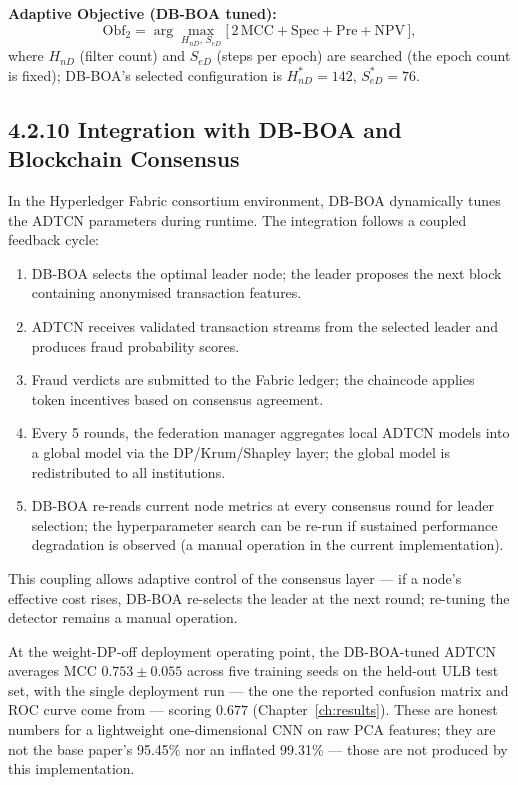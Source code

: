 \textbf{Adaptive Objective (DB-BOA tuned):}
\begin{equation}\label{eq:obf2_adtcn}
    \mathrm{Obf}_2 = \arg\max_{H_{nD},\, S_{eD}}
    \big[\, 2\,\mathrm{MCC} + \mathrm{Spec} + \mathrm{Pre} + \mathrm{NPV} \,\big],
\end{equation}
where $H_{nD}$ (filter count) and $S_{eD}$ (steps per epoch) are searched (the epoch count is fixed); DB-BOA's selected configuration is $H_{nD}^\ast = 142$, $S_{eD}^\ast = 76$.

\subsection*{4.2.10 Integration with DB-BOA and Blockchain Consensus}

In the Hyperledger Fabric consortium environment, DB-BOA dynamically tunes the ADTCN parameters during runtime. The integration follows a coupled feedback cycle:
\begin{enumerate}
    \item DB-BOA selects the optimal leader node; the leader proposes the next block containing anonymised transaction features.
    \item ADTCN receives validated transaction streams from the selected leader and produces fraud probability scores.
    \item Fraud verdicts are submitted to the Fabric ledger; the chaincode applies token incentives based on consensus agreement.
    \item Every 5 rounds, the federation manager aggregates local ADTCN models into a global model via the DP/Krum/Shapley layer; the global model is redistributed to all institutions.
    \item DB-BOA re-reads current node metrics at every consensus round for leader selection; the hyperparameter search can be re-run if sustained performance degradation is observed (a manual operation in the current implementation).
\end{enumerate}

This coupling allows adaptive control of the consensus layer — if a node's effective cost rises, DB-BOA re-selects the leader at the next round; re-tuning the detector remains a manual operation.

At the weight-DP-off deployment operating point, the DB-BOA-tuned ADTCN averages MCC $0.753 \pm 0.055$ across five training seeds on the held-out ULB test set, with the single deployment run --- the one the reported confusion matrix and ROC curve come from --- scoring $0.677$ (Chapter~\ref{ch:results}). These are honest numbers for a lightweight one-dimensional CNN on raw PCA features; they are not the base paper's 95.45\% nor an inflated 99.31\% — those are not produced by this implementation.

